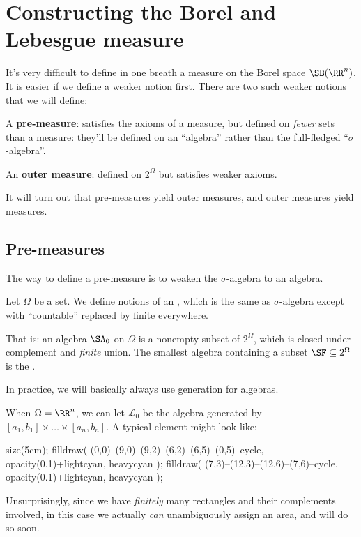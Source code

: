\chapter{Constructing the Borel and Lebesgue measure}
\label{ch:caratheodory_measure}
It's very difficult to define in one breath a measure
on the Borel space $\SB(\RR^n)$.
It is easier if we define a weaker notion first.
There are two such weaker notions that we will define:
\begin{itemize}
	\ii A \textbf{pre-measure}:
	satisfies the axioms of a measure,
	but defined on \emph{fewer} sets than a measure:
	they'll be defined on an ``algebra''
	rather than the full-fledged ``$\sigma$-algebra''.

	\ii An \textbf{outer measure}:
	defined on $2^\Omega$ but satisfies weaker axioms.
\end{itemize}
It will turn out that pre-measures yield outer measures,
and outer measures yield measures.


\section{Pre-measures}
The way to define a pre-measure is to weaken
the $\sigma$-algebra to an algebra.
\begin{definition}
	Let $\Omega$ be a set.
	We define notions of an ,
	which is the same as $\sigma$-algebra except
	with ``countable'' replaced by finite everywhere.

	That is: an algebra $\SA_0$ on $\Omega$ is a
	nonempty subset of $2^\Omega$,
	which is closed under complement and \emph{finite} union.
	The smallest algebra containing a subset $\SF \subseteq 2^\Omega$
	is the .
\end{definition}
In practice, we will basically always use generation for algebras.
\begin{example}
	When $\Omega = \RR^n$,
	we can let $\mathcal{L}_0$ be the algebra generated by
	$[a_1, b_1] \times \dots \times [a_n, b_n]$.
	A typical element might look like:
	\begin{center}
	\begin{asy}
		size(5cm);
		filldraw( (0,0)--(9,0)--(9,2)--(6,2)--(6,5)--(0,5)--cycle,
			opacity(0.1)+lightcyan, heavycyan );
		filldraw( (7,3)--(12,3)--(12,6)--(7,6)--cycle,
			opacity(0.1)+lightcyan, heavycyan );
	\end{asy}
	\end{center}
	Unsurprisingly, since we have \emph{finitely} many
	rectangles and their complements involved,
	in this case we actually \emph{can}
	unambiguously assign an area, and will do so soon.
\end{example}

